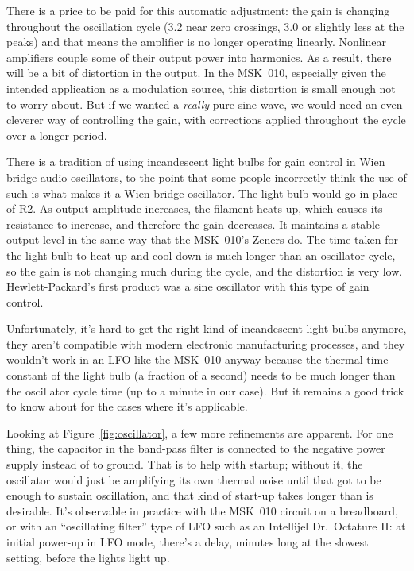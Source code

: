 There is a price to be paid for this automatic adjustment:  the gain
is changing throughout the oscillation cycle (3.2 near zero crossings, 3.0
or slightly less at the peaks) and that means the amplifier is no longer
operating linearly.  Nonlinear amplifiers couple some of their output power
into harmonics.  As a result, there will be a bit of distortion in the
output.  In the MSK~010, especially given the intended application as a
modulation source, this distortion is small enough not to worry about.  But
if we wanted a \emph{really} pure sine wave, we would need an even cleverer
way of controlling the gain, with corrections applied throughout the cycle
over a longer period.

There is a tradition of using incandescent light bulbs for gain control in
Wien bridge audio oscillators, to the point that some people incorrectly
think the use of such is what makes it a Wien bridge oscillator.  The light
bulb would go in place of R2.  As output amplitude increases, the filament
heats up, which causes its resistance to increase, and therefore the gain
decreases.  It maintains a stable output level in the same way that the
MSK~010's Zeners do.  The time taken for the light bulb to heat up and cool
down is much longer than an oscillator cycle, so the gain is not changing
much during the cycle, and the distortion is very low.  Hewlett-Packard's
first product was a sine oscillator with this type of gain control.

Unfortunately, it's hard to get the right kind of incandescent light bulbs
anymore, they aren't compatible with modern electronic manufacturing
processes, and they wouldn't work in an LFO like the MSK~010 anyway because
the thermal time constant of the light bulb (a fraction of a second) needs
to be much longer than the oscillator cycle time (up to a minute in our
case).  But it remains a good trick to know about for the cases where it's
applicable.

Looking at Figure~\ref{fig:oscillator}, a few more refinements are apparent. 
For one thing, the capacitor in the band-pass filter is connected to the
negative power supply instead of to ground.  That is to help with startup;
without it, the oscillator would just be amplifying its own thermal noise
until that got to be enough to sustain oscillation, and that kind of
start-up takes longer than is desirable.  It's observable in practice with
the MSK~010 circuit on a breadboard, or with an ``oscillating filter'' type
of LFO such as an Intellijel Dr.\ Octature II: at initial power-up in LFO
mode, there's a delay, minutes long at the slowest setting, before the
lights light up.

